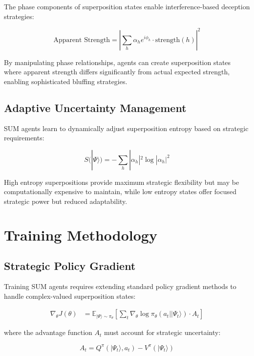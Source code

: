 \documentclass[11pt,a4paper]{article}
\begin{document}
The phase components of superposition states enable interference-based deception strategies:

\begin{equation}
\text{Apparent Strength} = \left|\sum_{h} \alpha_h e^{i\phi_h} \cdot \text{strength}(h)\right|^2
\end{equation}

By manipulating phase relationships, agents can create superposition states where apparent strength differs significantly from actual expected strength, enabling sophisticated bluffing strategies.

\subsection{Adaptive Uncertainty Management}

SUM agents learn to dynamically adjust superposition entropy based on strategic requirements:

\begin{equation}
S(|\Psi\rangle) = -\sum_{h} |\alpha_h|^2 \log |\alpha_h|^2
\end{equation}

High entropy superpositions provide maximum strategic flexibility but may be computationally expensive to maintain, while low entropy states offer focused strategic power but reduced adaptability.

\section{Training Methodology}

\subsection{Strategic Policy Gradient}

Training SUM agents requires extending standard policy gradient methods to handle complex-valued superposition states:

\begin{align}
\nabla_{\theta} J(\theta) &= \mathbb{E}_{|\Psi\rangle \sim \pi_{\theta}}\left[\sum_t \nabla_{\theta} \log \pi_{\theta}(a_t||\Psi_t\rangle) \cdot A_t\right]
\end{align}

where the advantage function $A_t$ must account for strategic uncertainty:

\begin{equation}
A_t = Q^{\pi}(|\Psi_t\rangle, a_t) - V^{\pi}(|\Psi_t\rangle)
\end{equation}
\end{document}
